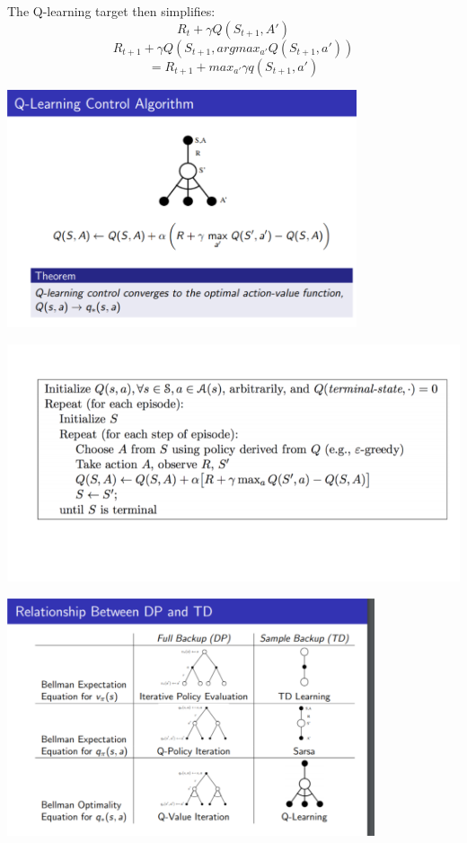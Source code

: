 \documentclass[a4paper]{article}
\begin{document}
\begin{itemize}
    \newline The Q-learning target then simplifies: 
    $$R_t + \gamma Q(S_{t+1}, A')$$
    $$R_{t+1} + \gamma Q(S_{t+1}, argmax_{a'}Q(S_{t+1}, a'))$$ $$= R_{t+1} + max_{a'} \gamma q(S_{t+1}, a')$$
\begin{center}
\includegraphics[width = \textwidth, height=7cm]{images/qlearning.png}
\end{center}
\begin{center}
\includegraphics[width = \textwidth, height=7cm]{images/qlearningalgo.png}
\end{center}
\begin{center}
\includegraphics[width = \textwidth, height=7cm]{images/summary1.png}

\end{center}
\end{itemize}
\end{document}
